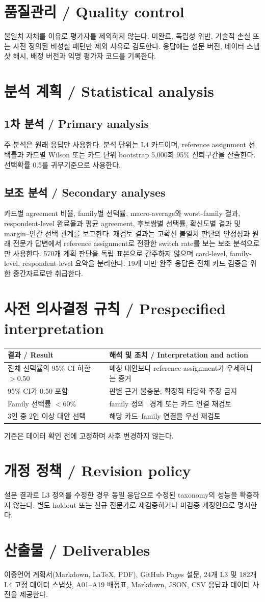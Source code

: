 \documentclass[11pt,a4paper]{article}
\newcommand{\bisection}[2]{\section{#1 / \texorpdfstring{\color{teal}}{}#2}}
\newcommand{\bisubsection}[2]{\subsection{#1 / #2}}
\begin{document}
\bisection{품질관리}{Quality control}
불일치 자체를 이유로 평가자를 제외하지 않는다. 미완료, 독립성 위반, 기술적 손실 또는 사전 정의된 비성실 패턴만 제외 사유로 검토한다. 응답에는 설문 버전, 데이터 스냅샷 해시, 배정 버전과 익명 평가자 코드를 기록한다.

\bisection{분석 계획}{Statistical analysis}
\bisubsection{1차 분석}{Primary analysis}
주 분석은 원래 응답만 사용한다. 분석 단위는 L4 카드이며, reference assignment 선택률과 카드별 Wilson 또는 카드 단위 bootstrap 5,000회 95\% 신뢰구간을 산출한다. 선택확률 0.5를 귀무기준으로 사용한다.

\bisubsection{보조 분석}{Secondary analyses}
카드별 agreement 비율, family별 선택률, macro-average와 worst-family 결과, respondent-level 완료율과 평균 agreement, 후보쌍별 선택률, 확신도별 결과 및 margin--인간 선택 관계를 보고한다. 재검토 결과는 고확신 불일치 판단의 안정성과 원래 전문가 답변에서 reference assignment로 전환한 switch rate를 보는 보조 분석으로만 사용한다. 570개 계획 판단을 독립 표본으로 간주하지 않으며 card-level, family-level, respondent-level 요약을 분리한다. 19개 미만 완주 응답은 전체 카드 검증을 위한 중간자료로만 취급한다.

\bisection{사전 의사결정 규칙}{Prespecified interpretation}
\begin{longtable}{p{}p{}}
\toprule
결과 / Result & 해석 및 조치 / Interpretation and action\\
\midrule
전체 선택률의 95\% CI 하한 $>0.50$ & 매칭 대안보다 reference assignment가 우세하다는 증거\\
95\% CI가 0.50 포함 & 판별 근거 불충분; 확정적 타당화 주장 금지\\
Family 선택률 $<60\%$ & family 정의·경계 또는 카드 연결 재검토\\
3인 중 2인 이상 대안 선택 & 해당 카드--family 연결을 우선 재검토\\
\bottomrule
\end{longtable}
기준은 데이터 확인 전에 고정하며 사후 변경하지 않는다.

\bisection{개정 정책}{Revision policy}
설문 결과로 L3 정의를 수정한 경우 동일 응답으로 수정된 taxonomy의 성능을 확증하지 않는다. 별도 holdout 또는 신규 전문가로 재검증하거나 미검증 개정안으로 명시한다.

\bisection{산출물}{Deliverables}
이중언어 계획서(Markdown, LaTeX, PDF), GitHub Pages 설문, 24개 L3 및 182개 L4 고정 데이터 스냅샷, A01--A19 배정표, Markdown, JSON, CSV 응답과 데이터 사전을 제공한다.
\end{document}
